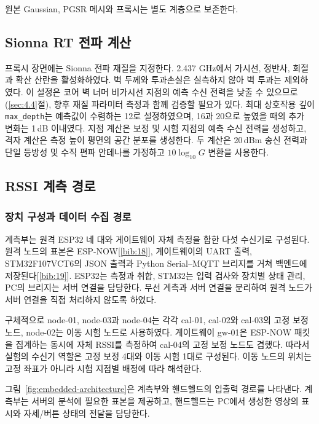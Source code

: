 \documentclass[11pt,a4paper]{article}
\begin{document}
원본 Gaussian, PGSR 메시와 프록시는 별도 계층으로 보존한다.

\subsection{Sionna RT 전파 계산}
\label{sec:3.4}

프록시 장면에는 Sionna 전파 재질을 지정한다. 2.437 GHz에서 가시선, 정반사, 회절과 확산 산란을 활성화하였다. 벽 두께와 투과손실은 실측하지 않아 벽 투과는
제외하였다. 이 설정은 코어 벽 너머 비가시선 지점의 예측 수신 전력을 낮출 수 있으므로(\ref{sec:4.4}절), 향후 재질 파라미터 측정과 함께 검증할 필요가 있다. 최대
상호작용 깊이 \texttt{max\_depth}는 예측값이 수렴하는 12로 설정하였으며, 16과 20으로 높였을 때의 추가 변화는 1\,dB 이내였다. 지점 계산은 보정 및 시험
지점의 예측 수신 전력을 생성하고, 격자 계산은 측정 높이 평면의 공간 분포를 생성한다. 두 계산은 20\,dBm 송신 전력과 단일 등방성 및 수직 편파 안테나를 가정하고
$10\log_{10}G$ 변환을 사용한다.

\subsection{RSSI 계측 경로}
\label{sec:3.5}

\subsubsection{장치 구성과 데이터 수집 경로}

계측부는 원격 ESP32 네 대와 게이트웨이 자체 측정을 합한 다섯 수신기로 구성된다. 원격 노드의 표본은
ESP-NOW[\ref{bib:18}], 게이트웨이의 UART 출력, STM32F107VCT6의 JSON 출력과 Python
Serial--MQTT 브리지를 거쳐 백엔드에 저장된다[\ref{bib:19}]. ESP32는 측정과 취합, STM32는 입력
검사와 장치별 상태 관리, PC의 브리지는 서버 연결을 담당한다. 무선 계측과 서버 연결을 분리하여 원격 노드가
서버 연결을 직접 처리하지 않도록 하였다.

구체적으로 node-01, node-03과 node-04는 각각 cal-01, cal-02와 cal-03의 고정 보정 노드,
node-02는 이동 시험 노드로 사용하였다. 게이트웨이 gw-01은 ESP-NOW 패킷을 집계하는 동시에 자체 RSSI를
측정하여 cal-04의 고정 보정 노드도 겸했다. 따라서 실험의 수신기 역할은 고정 보정 4대와 이동 시험 1대로
구성된다. 이동 노드의 위치는 고정 좌표가 아니라 시험 지점별 배정에 따라 해석한다.

그림~\ref{fig:embedded-architecture}은 계측부와 핸드헬드의 입출력 경로를 나타낸다. 계측부는 서버의
분석에 필요한 표본을 제공하고, 핸드헬드는 PC에서 생성한 영상의 표시와 자세/버튼 상태의 전달을 담당한다.
\end{document}
